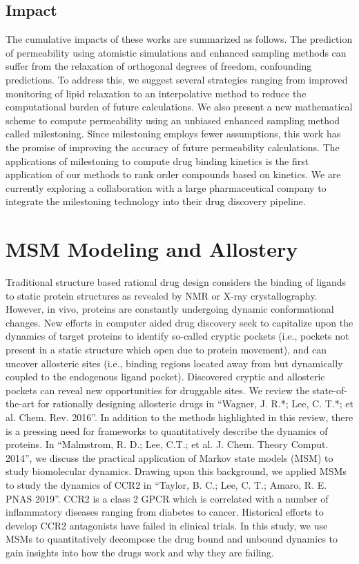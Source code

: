 \documentclass[12pt]{article}
\begin{document}
\subsection{Impact}
The cumulative impacts of these works are summarized as follows.
The prediction of permeability using atomistic simulations and enhanced sampling methods can suffer from the relaxation of orthogonal degrees of freedom, confounding predictions.
To address this, we suggest several strategies ranging from improved monitoring of lipid relaxation to an interpolative method to reduce the computational burden of future calculations.
We also present a new mathematical scheme to compute permeability using an unbiased enhanced sampling method called milestoning.
Since milestoning employs fewer assumptions, this work has the promise of improving the accuracy of future permeability calculations.
The applications of milestoning to compute drug binding kinetics is the first application of our methods to rank order compounds based on kinetics.
We are currently exploring a collaboration with a large pharmaceutical company to integrate the milestoning technology into their drug discovery pipeline.

\section{MSM Modeling and Allostery}
Traditional structure based rational drug design considers the binding of ligands to static protein structures as revealed by NMR or X-ray crystallography.
However, in vivo, proteins are constantly undergoing dynamic conformational changes.
New efforts in computer aided drug discovery seek to capitalize upon the dynamics of target proteins to identify so-called cryptic pockets (i.e., pockets not present in a static structure which open due to protein movement), and can uncover allosteric sites (i.e., binding regions located away from but dynamically coupled to the endogenous ligand pocket).
Discovered cryptic and allosteric pockets can reveal new opportunities for druggable sites.
We review the state-of-the-art for rationally designing allosteric drugs in ``Wagner, J. R.*; Lee, C. T.*; et al. Chem. Rev. 2016''.
In addition to the methods highlighted in this review, there is a pressing need for frameworks to quantitatively describe the dynamics of proteins.
In ``Malmstrom, R. D.; Lee, C.T.; et al. J. Chem. Theory Comput. 2014'', we discuss the practical application of Markov state models (MSM) to study biomolecular dynamics.
Drawing upon this background, we applied MSMs to study the dynamics of CCR2 in ``Taylor, B. C.; Lee, C. T.; Amaro, R. E. PNAS 2019''.
CCR2 is a class 2 GPCR which is correlated with a number of inflammatory diseases ranging from diabetes to cancer.
Historical efforts to develop CCR2 antagonists have failed in clinical trials.
In this study, we use MSMs to quantitatively decompose the drug bound and unbound dynamics to gain insights into how the drugs work and why they are failing.
\end{document}

